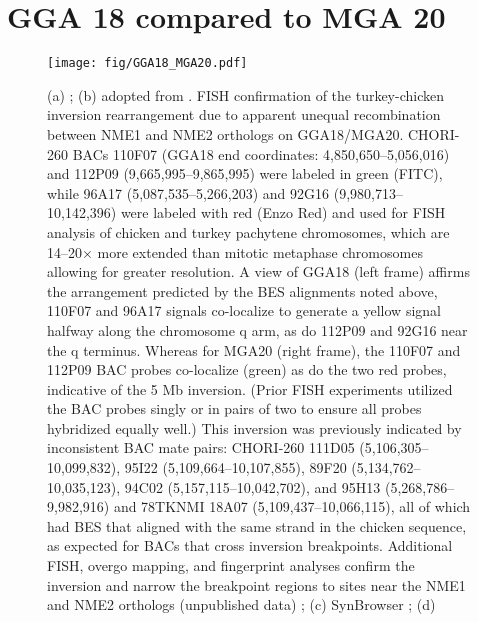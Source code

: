 \documentclass[a4paper,9pt]{extarticle}
\begin{document}
\section{GGA 18 compared to MGA 20}
\begin{figure}[!h]
  \centering
  \texttt{[image: fig/GGA18\_MGA20.pdf]}
  \caption{
  (a)
  ;
  (b)
  adopted from \cite{}.
  FISH confirmation of the turkey-chicken inversion rearrangement due to apparent unequal recombination between NME1 and NME2 orthologs on GGA18/MGA20. CHORI-260 BACs 110F07 (GGA18 end coordinates: 4,850,650–5,056,016) and 112P09 (9,665,995–9,865,995) were labeled in green (FITC), while 96A17 (5,087,535–5,266,203) and 92G16 (9,980,713–10,142,396) were labeled with red (Enzo Red) and used for FISH analysis of chicken and turkey pachytene chromosomes, which are 14–20× more extended than mitotic metaphase chromosomes allowing for greater resolution. A view of GGA18 (left frame) affirms the arrangement predicted by the BES alignments noted above, 110F07 and 96A17 signals co-localize to generate a yellow signal halfway along the chromosome q arm, as do 112P09 and 92G16 near the q terminus. Whereas for MGA20 (right frame), the 110F07 and 112P09 BAC probes co-localize (green) as do the two red probes, indicative of the 5 Mb inversion. (Prior FISH experiments utilized the BAC probes singly or in pairs of two to ensure all probes hybridized equally well.) This inversion was previously indicated by inconsistent BAC mate pairs: CHORI-260 111D05 (5,106,305–10,099,832), 95I22 (5,109,664–10,107,855), 89F20 (5,134,762–10,035,123), 94C02 (5,157,115–10,042,702), and 95H13 (5,268,786–9,982,916) and 78TKNMI 18A07 (5,109,437–10,066,115), all of which had BES that aligned with the same strand in the chicken sequence, as expected for BACs that cross inversion breakpoints. Additional FISH, overgo mapping, and fingerprint analyses confirm the inversion and narrow the breakpoint regions to sites near the NME1 and NME2 orthologs (unpublished data)
  ;
  (c)
  SynBrowser
  ;
  (d)
  }
\end{figure}

\end{document}
